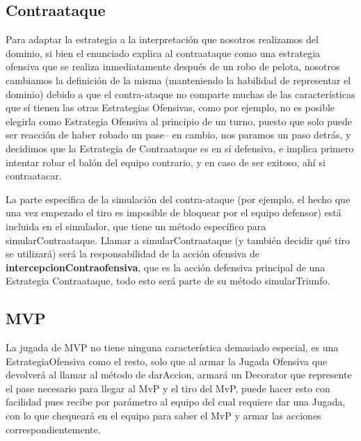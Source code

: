 \subsection{Contraataque}

Para adaptar la estrategia a la interpretación que nosotros realizamos del dominio, si bien el enunciado explica al contraataque como una estrategia ofensiva que se realiza inmediatamente después de un robo de pelota, nosotros cambiamos la definición de la misma (manteniendo la habilidad de representar el dominio) debido a que el contra-ataque no comparte muchas de las características que sí tienen las otras Estrategias Ofensivas, como por ejemplo, no es posible elegirla como Estrategia Ofensiva al principio de un turno, puesto que solo puede ser reacción de haber robado un pase-- en cambio, nos paramos un paso detrás, y decidimos que la Estrategia de Contraataque es en sí defensiva, e implica primero intentar robar el balón del equipo contrario, y en caso de ser exitoso, ahí si contraatacar.

La parte específica de la simulación del contra-ataque (por ejemplo, el hecho que una vez empezado el tiro es imposible de bloquear por el equipo defensor) está incluida en el simulador, que tiene un método específico para simularContraataque. Llamar a simularContraataque (y también decidir qué tiro se utilizará) será la responsabilidad de la acción ofensiva de \textbf{intercepcionContraofensiva}, que es la acción defensiva principal de una Estrategia Contraataque, todo esto será parte de su método simularTriunfo.

\subsection{MVP}

La jugada de MVP no tiene ninguna característica demasiado especial, es una 
EstrategiaOfensiva como el resto, solo que al armar la Jugada Ofensiva que 
devolverá al llamar al método de darAccion, armará un Decorator que represente 
el pase necesario para llegar al MvP y el tiro del MvP, puede hacer esto con 
facilidad pues recibe por parámetro al equipo del cual requiere dar una Jugada, 
con lo que chequeará en el equipo para saber el MvP y armar las acciones correspondientemente.

